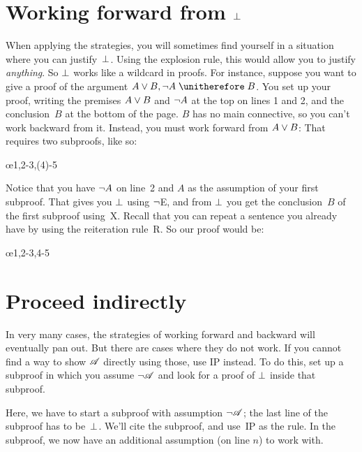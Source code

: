 \section{Working forward from $\bot$}\label{sec:backred}

When applying the strategies, you will sometimes find yourself in a situation where you can justify~$\bot$. Using the explosion rule, this would allow you to justify \emph{anything}. So $\bot$ works like a wildcard in proofs. For instance, suppose you want to give a proof of the argument $A \eor B, \enot A \therefore B$. You set up your proof, writing the premises $A \vee B$ and $\neg A$ at the top on lines 1 and 2, and the conclusion~$B$ at the bottom of the page. $B$ has no main connective, so you can't work backward from it. Instead, you must work forward from $A \vee B$: That requires two subproofs, like so:
\begin{fitchproof}
	\PR
	\PR
	\open
	 \AS
	\ellipsesline 
	\close 
	\open
	\AS
	\ellipsesline
	\close
	\oe{1,2-3,(4)-5} 
\end{fitchproof} 
Notice that you have $\neg A$ on line~2 and $A$ as the assumption of your first subproof. That gives you $\bot$ using $\neg$E, and from $\bot$ you get the conclusion~$B$ of the first subproof using~X. Recall that you can repeat a sentence you already have by using the reiteration rule~R. So our proof would be:
\begin{fitchproof}
	\PR
	\PR
	\open
	 \AS
	\close 
	\open
	\AS
	\close
	\oe{1,2-3,4-5} 
\end{fitchproof} 

\section{Proceed indirectly}

In very many cases, the strategies of working forward and backward will eventually pan out. But there are cases where they do not work.  If you cannot find a way to show $\mathscr{A}$ directly using those, use IP instead. To do this, set up a subproof in which you assume $\neg\mathscr{A}$ and look for a proof of $\bot$ inside that subproof.

\begin{fitchproof}
\open
{}\AS
\ellipsesline 
{}
\close
{}
\end{fitchproof}
Here, we have to start a subproof with assumption $\neg \mathscr{A}$;
the last line of the subproof has to be~$\bot$. We'll cite the subproof, and use~IP as the rule.  In the subproof, we now have an additional assumption (on line $n$) to work with.

